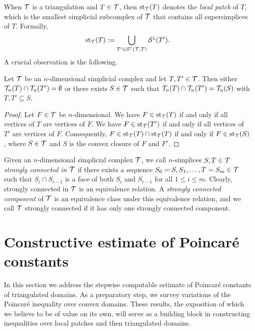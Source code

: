 \documentclass[a4paper]{amsart}
\begin{document}
When ${\mathcal T}$ is a triangulation and $T \in {\mathcal T}$, then $\operatorname{st}_{{\mathcal T}}(T)$ denotes the \emph{local patch} of $T$, which is the smallest simplicial subcomplex of ${\mathcal T}$ that contains all supersimplices of $T$. Formally,
\begin{gather*}
    \operatorname{st}_{{\mathcal T}}(T) := \bigcup_{ T' \in {\mathcal S}^{\uparrow}({\mathcal T},T) } {\mathcal S}^{\downarrow}(T').
\end{gather*}
A crucial observation is the following.

\begin{lemma}
 Let ${\mathcal T}$ be an $n$-dimensional simplicial complex and let $T,T' \in {\mathcal T}$.
 Then either ${\mathcal T}_{n}(T) \cap {\mathcal T}_{n}(T') = \emptyset$ or there exists $S \in {\mathcal T}$
 such that ${\mathcal T}_{n}(T) \cap {\mathcal T}_{n}(T') = {\mathcal T}_{n}(S)$ with $T, T' \subseteq S$.
\end{lemma}
\begin{proof}
 Let $F \in {\mathcal T}$ be $n$-dimensional.
 We have $F \in \operatorname{st}_{{\mathcal T}}(T )$ if and only if all vertices of $T $ are vertices of $F$.
 We have $F \in \operatorname{st}_{{\mathcal T}}(T')$ if and only if all vertices of $T'$ are vertices of $F$.
 Consequently, $F \in \operatorname{st}_{{\mathcal T}}(T) \cap \operatorname{st}_{{\mathcal T}}(T)$ if and only if $F \in \operatorname{st}_{{\mathcal T}}(S)$,
 where $S \in {\mathcal T}$ and $S$ is the convex closure of $F$ and $F'$.
\end{proof}

Given an $n$-dimensional simplicial complex ${\mathcal T}$, 
we call $n$-simplices $S,T \in {\mathcal T}$ \emph{strongly connected in ${\mathcal T}$} if there exists a sequence $S_0=S,S_1,\dots,T=S_m \in {\mathcal T}$ such that $S_{i} \cap S_{i-1}$ is a face of both $S_{i}$ and $S_{i-1}$ for all $1 \leq i \leq m$. Clearly, strongly connected in ${\mathcal T}$ is an equivalence relation. A \emph{strongly connected component} of ${\mathcal T}$ is an equivalence class under this equivalence relation, and we call ${\mathcal T}$ strongly connected if it has only one strongly connected component. 







\section{Constructive estimate of Poincar\'e constants}\label{section:poincare}

In this section we address the stepwise computable estimate of Poincar\'e constants of triangulated domains. As a preparatory step, we survey variations of the Poincar\'e inequality over convex domains. These results, the exposition of which we believe to be of value on its own, will serve as a building block in constructing inequalities over local patches and then triangulated domains.
\\
\end{document}
